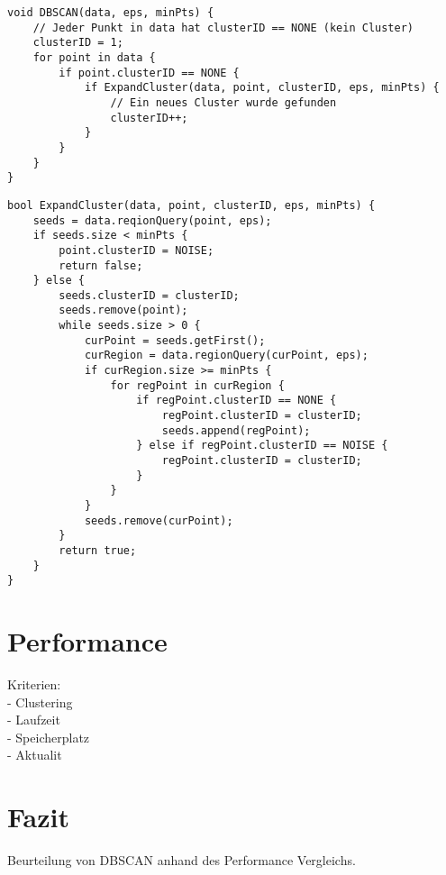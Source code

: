 \documentclass{lni}
\begin{document}
\begin{lstlisting}[caption={DBSCAN},label={lst:dbscan}]
void DBSCAN(data, eps, minPts) {
    // Jeder Punkt in data hat clusterID == NONE (kein Cluster)
    clusterID = 1;
    for point in data {
        if point.clusterID == NONE {
            if ExpandCluster(data, point, clusterID, eps, minPts) {
                // Ein neues Cluster wurde gefunden
                clusterID++;
            }
        }
    }
}
\end{lstlisting}

\begin{lstlisting}[caption={ExpandCluster},label={lst:expcluster}]
bool ExpandCluster(data, point, clusterID, eps, minPts) {
    seeds = data.reqionQuery(point, eps);
    if seeds.size < minPts {
        point.clusterID = NOISE;
        return false;
    } else {
        seeds.clusterID = clusterID;
        seeds.remove(point);
        while seeds.size > 0 {
            curPoint = seeds.getFirst();
            curRegion = data.regionQuery(curPoint, eps);
            if curRegion.size >= minPts {
                for regPoint in curRegion {
                    if regPoint.clusterID == NONE {
                        regPoint.clusterID = clusterID;
                        seeds.append(regPoint);
                    } else if regPoint.clusterID == NOISE {
                        regPoint.clusterID = clusterID;
                    }
                }
            }
            seeds.remove(curPoint);
        }
        return true;
    }
}
\end{lstlisting}

%
%

\section{Performance}
\label{sec:perf}

Kriterien:\\
- Clustering\\
- Laufzeit\\
- Speicherplatz\\
- Aktualit\\

\cite{REV} \cite{REVREV} \cite{PPF}

%
%

\section{Fazit}
\label{sec:fazit}

Beurteilung von DBSCAN anhand des Performance Vergleichs.


\end{document}
